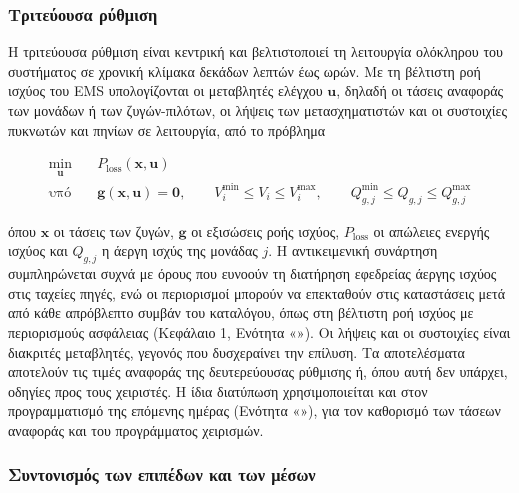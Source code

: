 \subsubsection{Τριτεύουσα ρύθμιση}

Η τριτεύουσα ρύθμιση είναι κεντρική και βελτιστοποιεί τη λειτουργία ολόκληρου του συστήματος σε
χρονική κλίμακα δεκάδων λεπτών έως ωρών. Με τη βέλτιστη ροή ισχύος του EMS υπολογίζονται οι
μεταβλητές ελέγχου $\mathbf{u}$, δηλαδή οι τάσεις αναφοράς των μονάδων ή των ζυγών-πιλότων, οι
λήψεις των μετασχηματιστών και οι συστοιχίες πυκνωτών και πηνίων σε λειτουργία, από το πρόβλημα

\begin{equation}
\begin{aligned}
\min_{\mathbf{u}} \quad & P_{\mathrm{loss}}(\mathbf{x}, \mathbf{u}) \\
\text{υπό} \quad & \mathbf{g}(\mathbf{x}, \mathbf{u}) = \mathbf{0}, \qquad
V_i^{\min} \le V_i \le V_i^{\max}, \qquad
Q_{g,j}^{\min} \le Q_{g,j} \le Q_{g,j}^{\max}
\end{aligned}
\label{eq:orpf}
\end{equation}

όπου $\mathbf{x}$ οι τάσεις των ζυγών, $\mathbf{g}$ οι εξισώσεις ροής ισχύος, $P_{\mathrm{loss}}$
οι απώλειες ενεργής ισχύος και $Q_{g,j}$ η άεργη ισχύς της μονάδας $j$. Η αντικειμενική
συνάρτηση συμπληρώνεται συχνά με όρους που ευνοούν τη διατήρηση εφεδρείας άεργης ισχύος στις
ταχείες πηγές, ενώ οι περιορισμοί μπορούν να επεκταθούν στις καταστάσεις μετά από κάθε
απρόβλεπτο συμβάν του καταλόγου, όπως στη βέλτιστη ροή ισχύος με περιορισμούς ασφάλειας
(Κεφάλαιο 1, Ενότητα «»). Οι λήψεις και οι συστοιχίες είναι διακριτές
μεταβλητές, γεγονός που δυσχεραίνει την επίλυση. Τα αποτελέσματα αποτελούν τις τιμές αναφοράς
της δευτερεύουσας ρύθμισης ή, όπου αυτή δεν υπάρχει, οδηγίες προς τους χειριστές. Η ίδια
διατύπωση χρησιμοποιείται και στον προγραμματισμό της επόμενης ημέρας (Ενότητα
«»), για τον καθορισμό των τάσεων αναφοράς και του προγράμματος
χειρισμών.

\subsubsection{Συντονισμός των επιπέδων και των μέσων}

